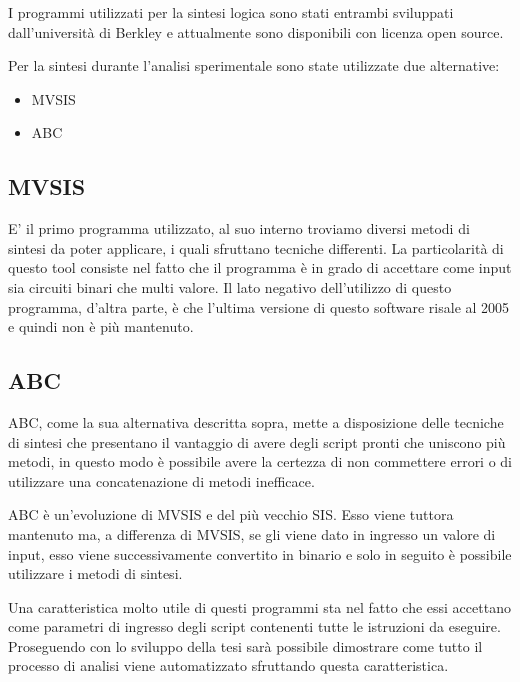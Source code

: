 \documentclass[
  italian,
]{book}
\providecommand{\tightlist}{%
  \setlength{\itemsep}{0pt}\setlength{\parskip}{0pt}}
\begin{document}
I programmi utilizzati per la sintesi logica sono stati entrambi sviluppati dall'università di Berkley e attualmente sono disponibili con licenza open source.

Per la sintesi durante l'analisi sperimentale sono state utilizzate due alternative:

\begin{itemize}
\tightlist
\item
  MVSIS
\item
  ABC
\end{itemize}

\hypertarget{mvsis-1}{%
\subsection{MVSIS}\label{mvsis-1}}

E' il primo programma utilizzato, al suo interno troviamo diversi metodi di sintesi da poter applicare, i quali sfruttano tecniche differenti. La particolarità di questo tool consiste nel fatto che il programma è in grado di accettare come input sia circuiti binari che multi valore. Il lato negativo dell'utilizzo di questo programma, d'altra parte, è che l'ultima versione di questo software risale al 2005 e quindi non è più mantenuto.

\hypertarget{abc-1}{%
\subsection{ABC}\label{abc-1}}

ABC, come la sua alternativa descritta sopra, mette a disposizione delle tecniche di sintesi che presentano il vantaggio di avere degli script pronti che uniscono più metodi, in questo modo è possibile avere la certezza di non commettere errori o di utilizzare una concatenazione di metodi inefficace.

ABC è un'evoluzione di MVSIS e del più vecchio SIS. Esso viene tuttora mantenuto ma, a differenza di MVSIS, se gli viene dato in ingresso un valore di input, esso viene successivamente convertito in binario e solo in seguito è possibile utilizzare i metodi di sintesi.

Una caratteristica molto utile di questi programmi sta nel fatto che essi accettano come parametri di ingresso degli script contenenti tutte le istruzioni da eseguire. Proseguendo con lo sviluppo della tesi sarà possibile dimostrare come tutto il processo di analisi viene automatizzato sfruttando questa caratteristica.
\end{document}
